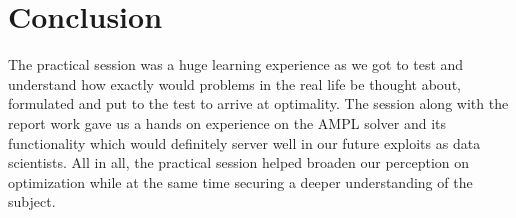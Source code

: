 \newpage
\section{Conclusion}
The practical session was a huge learning experience as we got to test and understand how exactly would problems in the real life be thought about, formulated and put to the test to arrive at optimality. The session along with the report work gave us a hands on experience on the AMPL solver and its functionality which would definitely server well in our future exploits as data scientists.  
All in all, the practical session helped broaden our perception on optimization while at the same time securing a deeper understanding of the subject.  

